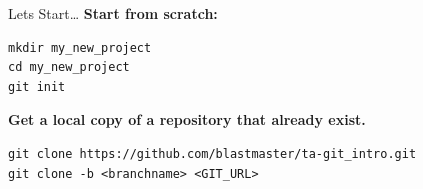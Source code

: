 \begin{frame}[fragile]{Lets Start\ldots}
    \textbf{Start from scratch:}
    \begin{lstlisting}
mkdir my_new_project
cd my_new_project
git init
    \end{lstlisting}
    \textbf{Get a local copy of a repository that already exist.}
    \begin{lstlisting}
git clone https://github.com/blastmaster/ta-git_intro.git
git clone -b <branchname> <GIT_URL>
    \end{lstlisting}
\end{frame}





